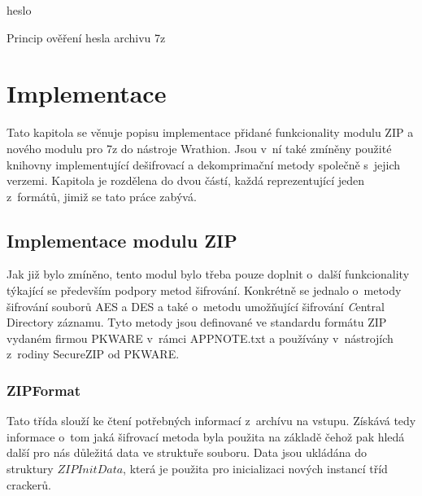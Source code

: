 \begin{algorithm}[!h]
    \SetStartEndCondition{ (}{)}{)}\SetAlgoBlockMarkers{}{}%
    \AlgoDisplayBlockMarkers\SetAlgoNoLine%
    \DontPrintSemicolon
    \Return heslo\;
    \caption{Princip ověření hesla archivu 7z}
    \label{alg:7z_desifr}
\end{algorithm}
    
\chapter{Implementace}
\label{ch:implementace}
Tato kapitola se věnuje popisu implementace přidané funkcionality modulu ZIP a nového modulu pro
7z do nástroje Wrathion. Jsou v~ní také zmíněny použité knihovny implementující dešifrovací a
dekomprimační metody společně s~jejich verzemi. Kapitola je rozdělena do dvou částí, každá
reprezentující jeden z~formátů, jimiž se tato práce zabývá.

\section{Implementace modulu ZIP}
Jak již bylo zmíněno, tento modul bylo třeba pouze doplnit o~další funkcionality týkající se 
především podpory metod šifrování. Konkrétně se jednalo o~metody šifrování souborů AES a DES a také
o~metodu umožňující šifrování {\textit Central Directory} záznamu. Tyto metody jsou definované ve
standardu formátu ZIP vydaném firmou PKWARE v~rámci APPNOTE.txt a používány
v~nástrojích z~rodiny SecureZIP od PKWARE.

\subsection{ZIPFormat}
Tato třída slouží ke čtení potřebných informací z~archívu na vstupu. Získává tedy informace o~tom
jaká šifrovací metoda byla použita na základě čehož pak hledá další pro nás důležitá data ve
struktuře souboru. Data jsou ukládána do struktury $ZIPInitData$, která je použita pro
inicializaci nových instancí tříd crackerů. 

